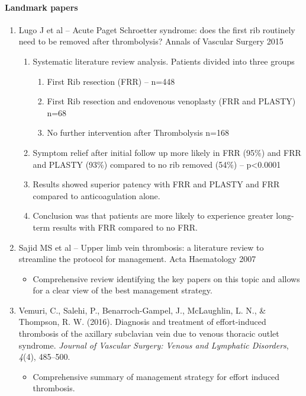 \documentclass[
]{book}
\providecommand{\tightlist}{%
  \setlength{\itemsep}{0pt}\setlength{\parskip}{0pt}}
\begin{document}
\hypertarget{landmark-papers}{%
\paragraph{Landmark papers}\label{landmark-papers}}

\begin{enumerate}
\def\labelenumi{\arabic{enumi}.}
\item
  Lugo J et al -- Acute Paget Schroetter syndrome: does the first rib
  routinely need to be removed after thrombolysis? Annals of Vascular
  Surgery 2015 \citep{lugoAcutePagetSchroetter2015}

  \begin{enumerate}
  \def\labelenumii{\arabic{enumii}.}
  \item
    Systematic literature review analysis. Patients divided into
    three groups

    \begin{enumerate}
    \def\labelenumiii{\arabic{enumiii}.}
    \item
      First Rib resection (FRR) -- n=448
    \item
      First Rib resection and endovenous venoplasty (FRR and
      PLASTY) n=68
    \item
      No further intervention after Thrombolysis n=168
    \end{enumerate}
  \item
    Symptom relief after initial follow up more likely in FRR (95\%)
    and FRR and PLASTY (93\%) compared to no rib removed (54\%) --
    p\textless0.0001
  \item
    Results showed superior patency with FRR and PLASTY and FRR
    compared to anticoagulation alone.
  \item
    Conclusion was that patients are more likely to experience
    greater long-term results with FRR compared to no FRR.
  \end{enumerate}
\item
  Sajid MS et al -- Upper limb vein thrombosis: a literature review to
  streamline the protocol for management. Acta Haematology 2007
  \citep{sajidUpperLimbDeep2007}

  \begin{itemize}
  \tightlist
  \item
    Comprehensive review identifying the key papers on this topic
    and allows for a clear view of the best management strategy.
  \end{itemize}
\item
  Vemuri, C., Salehi, P., Benarroch-Gampel, J., McLaughlin, L. N., \&
  Thompson, R. W. (2016). Diagnosis and treatment of effort-induced
  thrombosis of the axillary subclavian vein due to venous thoracic
  outlet syndrome. \emph{Journal of Vascular Surgery: Venous and Lymphatic
  Disorders}, \emph{4}(4), 485--500.
  \citep{vemuriDiagnosisTreatmentEffortinduced2016}

  \begin{itemize}
  \tightlist
  \item
    Comprehensive summary of management strategy for effort induced
    thrombosis.
  \end{itemize}
\end{enumerate}
\end{document}
